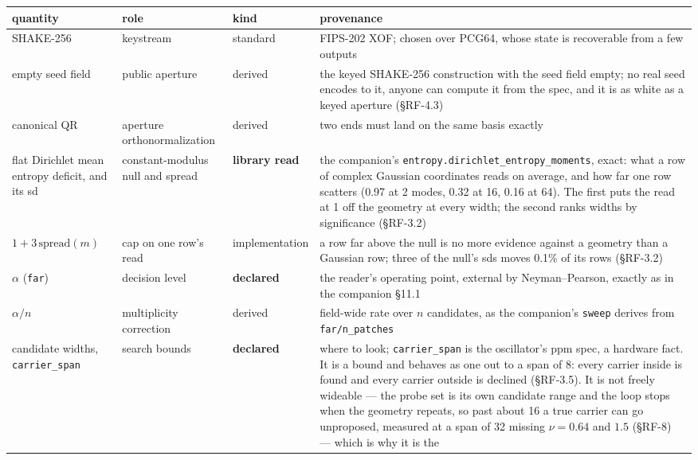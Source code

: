 \documentclass[10pt,letterpaper,twocolumn]{article}
\begin{document}
\begin{table}[tp]
\centering\footnotesize
\begin{tabular}{L{0.117\textwidth}L{0.150\textwidth}L{0.117\textwidth}L{0.550\textwidth}}
\toprule
quantity & role & kind & provenance \\
\midrule
SHAKE-256 & keystream & standard & FIPS-202 XOF; chosen over PCG64, whose state is recoverable from a few
outputs \\
empty seed field & public aperture & derived & the keyed SHAKE-256 construction with the seed field empty; no real seed
encodes to it, anyone can compute it from the spec, and it is as white
as a keyed aperture (§RF-4.3) \\
canonical QR & aperture orthonormalization & derived & two ends must land on the same basis exactly \\
flat Dirichlet mean entropy deficit, and its sd & constant-modulus null and spread & \textbf{library read} & the companion's
\texttt{entropy.\allowbreak{}dirichlet\_\allowbreak{}entropy\_\allowbreak{}moments},
exact: what a row of complex Gaussian coordinates reads on average, and
how far one row scatters (0.97 at 2 modes, 0.32 at 16, 0.16 at 64). The
first puts the read at 1 off the geometry at every width; the second
ranks widths by significance (§RF-3.2) \\
\(1 + 3\,\text{spread}(m)\) & cap on one row's read & implementation & a row far above the null is no more evidence against a geometry than a
Gaussian row; three of the null's sds moves 0.1\% of its rows (§RF-3.2) \\
\(\alpha\) (\texttt{far}) & decision level & \textbf{declared} & the reader's operating point, external by Neyman--Pearson, exactly as in
the companion §11.1 \\
\(\alpha/n\) & multiplicity correction & derived & field-wide rate over \(n\) candidates, as the companion's \texttt{sweep}
derives from \texttt{far/\allowbreak{}n\_\allowbreak{}patches} \\
candidate widths, \texttt{carrier\_\allowbreak{}span} & search bounds & \textbf{declared} & where to look; \texttt{carrier\_\allowbreak{}span} is the oscillator's
ppm spec, a hardware fact. It is a bound and behaves as one out to a
span of 8: every carrier inside is found and every carrier outside is
declined (§RF-3.5). It is not freely wideable --- the probe set is its
own candidate range and the loop stops when the geometry repeats, so
past about 16 a true carrier can go unproposed, measured at a span of 32
missing \(\nu = 0.64\) and \(1.5\) (§RF-8) --- which is why it is the

\end{tabular}
\end{table}
\end{document}
